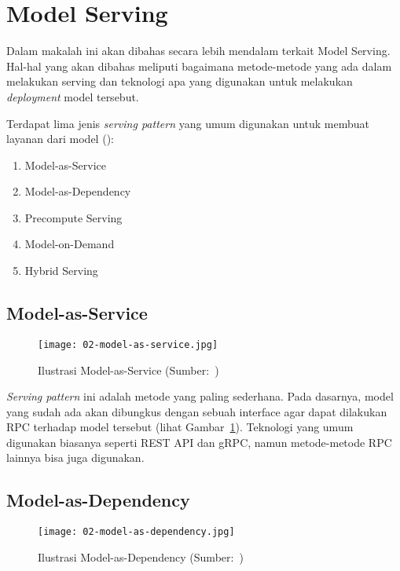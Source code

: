 \section{Model Serving}\label{chap:model-serving}

Dalam makalah ini akan dibahas secara lebih mendalam terkait Model Serving.
Hal-hal yang akan dibahas meliputi bagaimana metode-metode yang ada dalam melakukan serving dan teknologi apa yang digunakan untuk melakukan \textit{deployment} model tersebut.

Terdapat lima jenis \textit{serving pattern} yang umum digunakan untuk membuat layanan dari model (\cite{mlopsorg}):
\begin{enumerate}
  \item Model-as-Service
  \item Model-as-Dependency
  \item Precompute Serving
  \item Model-on-Demand
  \item Hybrid Serving
\end{enumerate}

\subsection{Model-as-Service}

\begin{figure}
  \centering
  \texttt{[image: 02-model-as-service.jpg]}
  \caption{Ilustrasi Model-as-Service (Sumber:~\cite{book-handsonml})}\label{fig:model-as-service}
\end{figure}

\textit{Serving pattern} ini adalah metode yang paling sederhana.
Pada dasarnya, model yang sudah ada akan dibungkus dengan sebuah interface agar dapat dilakukan RPC terhadap model tersebut (lihat Gambar~\ref{fig:model-as-service}).
Teknologi yang umum digunakan biasanya seperti REST API dan gRPC, namun metode-metode RPC lainnya bisa juga digunakan.

\subsection{Model-as-Dependency}

\begin{figure}
  \centering
  \texttt{[image: 02-model-as-dependency.jpg]}
  \caption{Ilustrasi Model-as-Dependency (Sumber:~\cite{book-handsonml})}\label{fig:model-as-dependency}
\end{figure}

